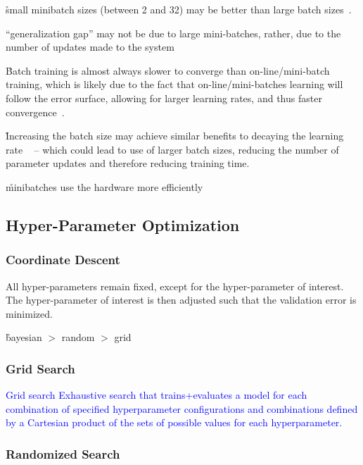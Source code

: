 \r{small minibatch sizes (between 2 and 32) may be better than large batch sizes~\cite{masters2018revisiting}.}

\r{``generalization gap'' may not be due to large mini-batches, rather, due to the number of updates made to the system~\cite{hoffer2017train}}

\r{Batch training is almost always slower to converge than on-line/mini-batch training, which is likely due to the fact that on-line/mini-batches learning will follow the error surface, allowing for larger learning rates, and thus faster convergence~\cite{wilson2003general}.}

\r{Increasing the batch size may achieve similar benefits to decaying the learning rate ~\cite{smith2017don} -- which could lead to use of larger batch sizes, reducing the number of parameter updates and therefore reducing training time.}

\r{minibatches use the hardware more efficiently}


\subsection{Hyper-Parameter Optimization}




\subsubsection{Coordinate Descent}

All hyper-parameters remain fixed, except for the hyper-parameter of interest. The hyper-parameter of interest is then adjusted such that the validation error is minimized.

\r{bayesian $>$ random $>$ grid}

\subsubsection{Grid Search}

\textcolor{blue}{{Grid search} Exhaustive search that trains+evaluates a model for each combination of specified hyperparameter configurations and combinations defined by a Cartesian product of the sets of possible values for each hyperparameter.}

\subsubsection{Randomized Search}

